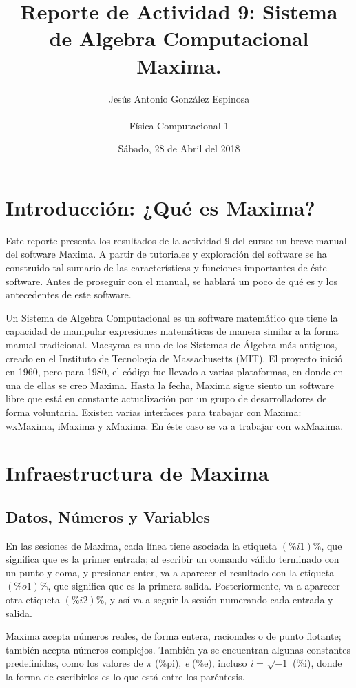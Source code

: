 \documentclass[a4paper]{article}
\title{Reporte de Actividad 9: Sistema de Algebra Computacional Maxima.}
\author{Jesús Antonio González Espinosa \\ \\ Física Computacional 1}
\date{Sábado, 28 de Abril del 2018}
\begin{document}
\maketitle

\section{Introducción: ¿Qué es Maxima?}

Este reporte presenta los resultados de la actividad 9 del curso: un breve manual del software Maxima. A partir de tutoriales y exploración del software se ha construido tal sumario de las características y funciones importantes de éste software. Antes de proseguir con el manual, se hablará un poco de qué es y los antecedentes de este software.

Un Sistema de Algebra Computacional es un software matemático que tiene la capacidad de manipular expresiones matemáticas de manera similar a la forma manual tradicional. Macsyma es uno de los Sistemas de Álgebra más antiguos, creado en el Instituto de Tecnología de Massachusetts (MIT). El proyecto inició en 1960, pero para 1980, el código fue llevado a varias plataformas, en donde en una de ellas se creo Maxima. Hasta la fecha, Maxima sigue siento un software libre que está en constante actualización por un grupo de desarrolladores de forma voluntaria. Existen varias interfaces para trabajar con Maxima: wxMaxima, iMaxima y xMaxima. En éste caso se va a trabajar con wxMaxima.

\section{Infraestructura de Maxima}
\subsection{Datos, Números y Variables}
En las sesiones de Maxima, cada línea tiene asociada la etiqueta $(\%i1)\%$, que significa que es la primer entrada; al escribir un comando válido terminado con un punto y coma, y presionar enter, va a aparecer el resultado con la etiqueta $(\%o1)\%$, que significa que es la primera salida. Posteriormente, va a aparecer otra etiqueta $(\%i2)\%$, y así va a seguir la sesión numerando cada entrada y salida.

Maxima acepta números reales, de forma entera, racionales o de punto flotante; también acepta números complejos. También ya se encuentran algunas constantes predefinidas, como los valores de $\pi$ (\%pi), \textit{e} (\%e), incluso \textit{i} = $\sqrt{-1}$ (\%i), donde la forma de escribirlos es lo que está entre los paréntesis. 
\end{document}

